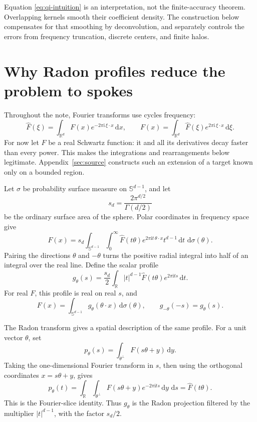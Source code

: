 \documentclass[11pt,letterpaper]{article}
\newcommand{\R}{\mathbb R}
\newcommand{\dd}{\,\mathrm d}
\newcommand{\ii}{\mathrm i}
\newcommand{\Sph}{\mathbb S^{d-1}}
\theoremstyle{definition}
\theoremstyle{remark}
\begin{document}
Equation \eqref{eq:qi-intuition} is an interpretation, not the finite-accuracy
theorem. Overlapping kernels smooth their coefficient density. The construction
below compensates for that smoothing by deconvolution, and separately controls
the errors from frequency truncation, discrete centers, and finite halos.

\section{Why Radon profiles reduce the problem to spokes}
Throughout the note, Fourier transforms use cycles frequency:
\[
 \widehat F(\xi)=\int_{\R^d}F(x)e^{-2\pi\ii\,\xi\cdot x}\dd x,
 \qquad
 F(x)=\int_{\R^d}\widehat F(\xi)e^{2\pi\ii\,\xi\cdot x}\dd\xi.
\]
For now let \(F\) be a real Schwartz function: it and all its derivatives
decay faster than every power. This makes the integrations and rearrangements
below legitimate. Appendix~\ref{sec:source} constructs such an extension of a
target known only on a bounded region.

Let \(\sigma\) be probability surface measure on \(\Sph\), and let
\[
 s_d=\frac{2\pi^{d/2}}{\Gamma(d/2)}
\]
be the ordinary surface area of the sphere. Polar coordinates in frequency
space give
\[
 F(x)=s_d\int_{\Sph}\int_0^\infty
       \widehat F(t\theta)e^{2\pi\ii t\,\theta\cdot x}t^{d-1}\dd t\,\dd\sigma(\theta).
\]
Pairing the directions \(\theta\) and \(-\theta\) turns the positive radial
integral into half of an integral over the real line. Define the scalar profile
\begin{equation}\label{eq:profile}
 g_\theta(s)=\frac{s_d}{2}\int_\R
       |t|^{d-1}\widehat F(t\theta)e^{2\pi\ii ts}\dd t.
\end{equation}
For real \(F\), this profile is real on real \(s\), and
\begin{equation}\label{eq:radon-reconstruction}
 F(x)=\int_{\Sph}g_\theta(\theta\cdot x)\dd\sigma(\theta),
 \qquad g_{-\theta}(-s)=g_\theta(s).
\end{equation}

The Radon transform gives a spatial description of the same profile.
For a unit vector \(\theta\), set
\[
 p_\theta(s)=\int_{\theta^\perp}F(s\theta+y)\dd y.
\]
Taking the one-dimensional Fourier transform in \(s\), then using the
orthogonal coordinates \(x=s\theta+y\), gives
\[
 \widehat p_\theta(t)
 =\int_\R\int_{\theta^\perp}F(s\theta+y)e^{-2\pi\ii ts}\dd y\,\dd s
 =\widehat F(t\theta).
\]
This is the Fourier-slice identity. Thus \(g_\theta\) is the Radon projection
filtered by the multiplier \(|t|^{d-1}\), with the factor \(s_d/2\).
\end{document}
